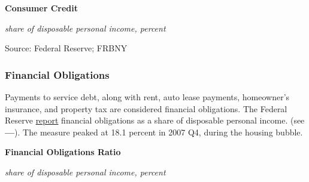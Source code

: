 \documentclass{report}
\makeatletter
\newcommand{\tbllink}[1]{\href{https://raw.githubusercontent.com/bdecon/US-chartbook/master/chartbook/data/#1}{\faTable}}
\newcommand*\short[1]{\expandafter\@gobbletwo\number\numexpr#1\relax}
\newcommand{\stdnode}[3]{\node[below, align=left, shift=({#1,#2})]{#3};}
\newcommand{\dateaxisticks}{
		date coordinates in=x, axis line style={draw=none},
		xmax={2020-10-01},
		max space between ticks=40,	    
		xtick={{1990-01-01}, {1992-01-01}, {1994-01-01}, 
			{1996-01-01}, {1998-01-01}, {2000-01-01}, 
			{2002-01-01}, {2004-01-01}, {2006-01-01},
			{2008-01-01}, {2010-01-01}, {2012-01-01}, {2014-01-01},
		    {2016-01-01}, {2018-01-01}, {2020-01-01}},
		minor xtick={{1989-01-01}, {1991-01-01}, {1993-01-01},
			{1995-01-01}, {1997-01-01}, {1999-01-01}, 
			{2001-01-01}, {2003-01-01}, {2005-01-01}, {2007-01-01},
		    {2009-01-01}, {2011-01-01}, {2013-01-01}, {2015-01-01},
		    {2017-01-01}, {2019-01-01}},
		enlarge y limits={0.06}, enlarge x limits={0.01},
		}
\newcommand{\shdateaxisticks}{
		date coordinates in=x, axis line style={draw=none},
		xmax={2020-11-15},
		max space between ticks=40,	    
		xtick={{1990-01-01}, {1995-01-01}, {2000-01-01}, 
			{2005-01-01}, {2010-01-01}, {2015-01-01}, {2020-01-01}},
		minor xtick={},
		enlarge y limits={0.06}, enlarge x limits={0.01},
		}
\newcommand{\bbar}[2]{extra #1 ticks = {{#2}}, extra #1 tick labels = ,
		extra #1 tick style = {grid=major, grid style={thick, black!25}},}
\newcommand{\stdline}[4]{\addplot[very thick, no markers, color=#1] 
		table [x=#2, y=#3, col sep=comma] {#4};	}
\newcommand{\thinline}[4]{\addplot[no markers, color=#1] 
		table [x=#2, y=#3, col sep=comma] {#4};	}
\newcommand{\thickline}[4]{\addplot[ultra thick, no markers, color=#1] 
		table [x=#2, y=#3, col sep=comma] {#4};	}
\newcommand{\rbars}{
		\fill[color=black!10] (axis cs:{1990-07-01},\pgfkeysvalueof{/pgfplots/ymin}) rectangle 
			(axis cs:{1991-03-01}, \pgfkeysvalueof{/pgfplots/ymax});
		\fill[color=black!10] (axis cs:{2007-12-01},\pgfkeysvalueof{/pgfplots/ymin}) rectangle 
			(axis cs:{2009-07-01}, \pgfkeysvalueof{/pgfplots/ymax});
		\fill[color=black!10] (axis cs:{2001-03-01},\pgfkeysvalueof{/pgfplots/ymin}) rectangle 
			(axis cs:{2001-11-01}, \pgfkeysvalueof{/pgfplots/ymax});
		\fill[color=black!10] (axis cs:{2020-02-01},\pgfkeysvalueof{/pgfplots/ymin}) rectangle 
			(axis cs:{2020-10-01}, \pgfkeysvalueof{/pgfplots/ymax});}
\makeatother
\begin{document}
{{{\begin{minipage}{0.76\textwidth}


\vspace{3mm}

\normalsize \textbf{Consumer Credit}

\footnotesize{\textit{share of disposable personal income, percent}}

\hspace*{-2mm} 

\footnotesize{Source: Federal Reserve; FRBNY} \hfill \tbllink{cc_dpi_monthly.csv}
\end{minipage}

\vspace{5mm}

\subsubsection*{\color{black!70} \seriffont Financial Obligations}
\begin{minipage}{0.3\textwidth}
\small Payments to service debt, along with rent, auto lease payments, homeowner's insurance, and property tax are considered financial obligations. The Federal Reserve \href{https://www.federalreserve.gov/releases/housedebt/default.htm}{report} financial obligations as a share of disposable personal income.   (see {\color{blue!80!black}\textbf{---}}). The measure peaked at 18.1 percent in 2007 Q4, during the housing bubble.
\end{minipage}\hspace{8mm}
\begin{minipage}{0.405\textwidth}
\normalsize \textbf{Financial Obligations Ratio}

\footnotesize{\textit{share of disposable personal income, percent}}

\hspace*{-2mm} 


\end{minipage}}}}
\end{document}
